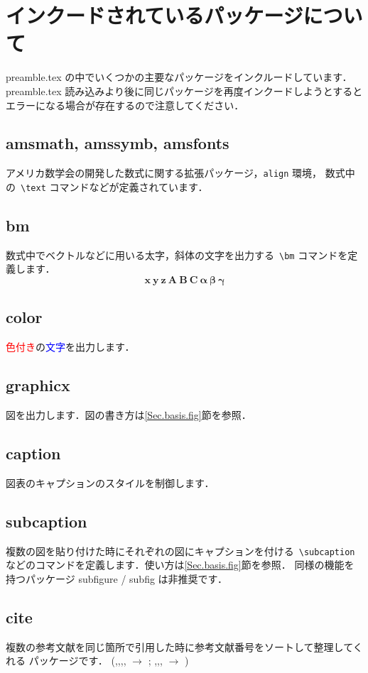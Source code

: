 \documentclass[dvipdfmx,report,disablejfam,nosetpagesize,12pt]{jsbook}
\begin{document}
\section{インクードされているパッケージについて}
preamble.tex の中でいくつかの主要なパッケージをインクルードしています．
preamble.tex 読み込みより後に同じパッケージを再度インクードしようとすると
エラーになる場合が存在するので注意してください．

\subsection*{amsmath, amssymb, amsfonts}
アメリカ数学会の開発した数式に関する拡張パッケージ，\verb+align+ 環境，
数式中の\ \verb+\text+ コマンドなどが定義されています．

\subsection*{bm}
数式中でベクトルなどに用いる太字，斜体の文字を出力する\ \verb+\bm+ 
コマンドを定義します．
\begin{equation}
   \bm{x}\ \bm{y\ z}\ \bm{A\ B\ C}\ \bm{\alpha\ \beta\ \gamma}
\end{equation}

\subsection*{color}
\textcolor{red}{色付き}の\textcolor{blue}{文字}を\textcolor[rgb]{0,0.5,0}{出力}します．

\subsection*{graphicx}
図を出力します．図の書き方は\ref{Sec.basis.fig}節を参照．

\subsection*{caption}
図表のキャプションのスタイルを制御します．

\subsection*{subcaption}
複数の図を貼り付けた時にそれぞれの図にキャプションを付ける\ \verb+\subcaption+
などのコマンドを定義します．使い方は\ref{Sec.basis.fig}節を参照．
同様の機能を持つパッケージ subfigure / subfig は非推奨です．

\subsection*{cite}
複数の参考文献を同じ箇所で引用した時に参考文献番号をソートして整理してくれる
パッケージです．
(\cite{Keys1981},\cite{Hou1978},\cite{Jensen1995},\cite{Xin2000},
\cite{Muresan2004}
$\rightarrow$ \cite{Keys1981,Hou1978,Jensen1995,Xin2000,Muresan2004};
\cite{Hou1978},\cite{Carey1999},\cite{Zhang2006},\cite{Muresan2004}
$\rightarrow$ \cite{Hou1978,Carey1999,Zhang2006,Muresan2004,Yoneji2005,Takagi2016})
\end{document}

